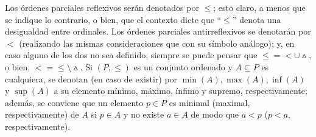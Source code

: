 Los órdenes parciales reflexivos serán denotados por $\leq$; esto claro, a menos que se indique lo contrario, o bien, que el contexto dicte que ``$\leq$'' denota una desigualdad entre ordinales. Los órdenes parciales antirreflexivos se denotarán por $<$ (realizando las mismas consideraciones que con su símbolo análogo); y, en caso alguno de los dos no sea definido, siempre se puede pensar que $ \leq = < \cup \vartriangle$, o bien, $< = \leq \setminus \vartriangle$. Si $(P,\leq)$ es un conjunto ordenado y $A \subseteq P$ es cualquiera, se denotan (en caso de existir) por $\min(A), \max(A), \inf(A)$ y $\sup(A)$ a su elemento mínimo, máximo, ínfimo y supremo, respectivamente; además, se conviene que un elemento $p \in P$ es minimal (maximal, respectivamente) de $A$ si $p \in A$ y no existe $a \in A$ de modo que $a<p$ ($p<a$, respectivamente).

